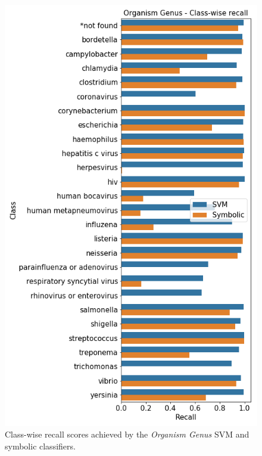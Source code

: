 \documentclass[sigconf]{acmart}
\begin{document}
\begin{figure}
    \centering
    \includegraphics[width=\linewidth]{ogc_recall.png}
    \caption{Class-wise recall scores achieved by the \textit{Organism Genus} SVM and symbolic classifiers.}
    \label{fig:ogc_recall}
\end{figure}
\end{document}
